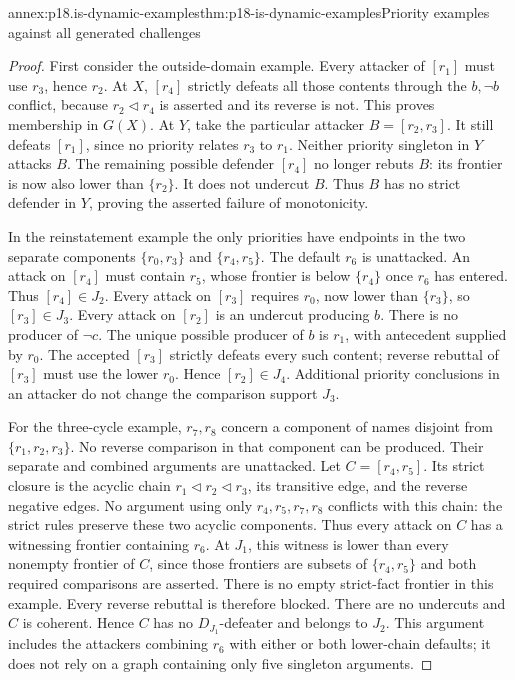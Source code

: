 \begin{annexitem}{annex:p18.is-dynamic-examples}{thm:p18-is-dynamic-examples}{Priority examples against all generated challenges}
\begin{proof}
First consider the outside-domain example. Every attacker of
\([r_1]\) must use \(r_3\), hence \(r_2\).
At \(X\), \([r_4]\) strictly defeats all those contents through
the \(b,\neg b\) conflict, because \(r_2\triangleleft r_4\)
is asserted and its reverse is not. This proves membership
in \(G(X)\). At \(Y\), take the particular attacker
\(B=[r_2,r_3]\). It still defeats \([r_1]\), since no priority
relates \(r_3\) to \(r_1\).
Neither priority singleton in \(Y\) attacks \(B\).
The remaining possible defender \([r_4]\) no longer rebuts \(B\):
its frontier is now also lower than \(\{r_2\}\).
It does not undercut \(B\). Thus \(B\) has no strict defender
in \(Y\), proving the asserted failure of monotonicity.

In the reinstatement example the only priorities have endpoints
in the two separate components \(\{r_0,r_3\}\) and
\(\{r_4,r_5\}\). The default \(r_6\) is unattacked.
An attack on \([r_4]\) must contain \(r_5\), whose frontier
is below \(\{r_4\}\) once \(r_6\) has entered.
Thus \([r_4]\in J_2\).
Every attack on \([r_3]\) requires \(r_0\), now lower than
\(\{r_3\}\), so \([r_3]\in J_3\).
Every attack on \([r_2]\) is an undercut producing \(b\).
There is no producer of \(\neg c\).
The unique possible producer of \(b\) is \(r_1\), with
antecedent supplied by \(r_0\). The accepted \([r_3]\)
strictly defeats every such content; reverse rebuttal of
\([r_3]\) must use the lower \(r_0\).
Hence \([r_2]\in J_4\). Additional priority conclusions in
an attacker do not change the comparison support \(J_3\).

For the three-cycle example, \(r_7,r_8\) concern a component
of names disjoint from \(\{r_1,r_2,r_3\}\).
No reverse comparison in that component can be produced.
Their separate and combined arguments are unattacked.
Let \(C=[r_4,r_5]\). Its strict closure is the acyclic chain
\(r_1\triangleleft r_2\triangleleft r_3\), its transitive edge,
and the reverse negative edges. No argument using only
\(r_4,r_5,r_7,r_8\) conflicts with this chain: the strict
rules preserve these two acyclic components.
Thus every attack on \(C\) has a witnessing frontier containing
\(r_6\). At \(J_1\), this witness is lower than every nonempty
frontier of \(C\), since those frontiers are subsets of
\(\{r_4,r_5\}\) and both required comparisons are asserted.
There is no empty strict-fact frontier in this example.
Every reverse rebuttal is therefore blocked. There are no
undercuts and \(C\) is coherent. Hence \(C\) has no
\(D_{J_1}\)-defeater and belongs to \(J_2\).
This argument includes the attackers combining \(r_6\)
with either or both lower-chain defaults; it does not rely
on a graph containing only five singleton arguments.


\end{proof}
\end{annexitem}
